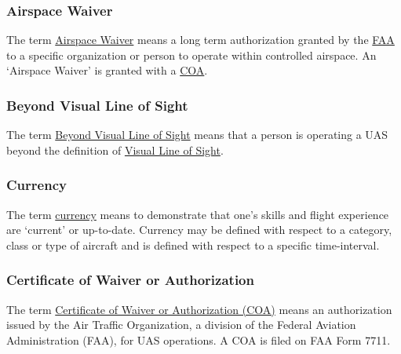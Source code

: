 \documentclass[
]{book}
\begin{document}
\hypertarget{AW}{%
\subsubsection*{Airspace Waiver}\label{AW}}

The term \protect\hyperlink{AW}{Airspace Waiver} means a long term authorization granted by the \protect\hyperlink{FAA}{FAA} to a specific organization or person to operate within controlled airspace. An `Airspace Waiver' is granted with a \protect\hyperlink{COA}{COA}.





\hypertarget{BVLOS}{%
\subsubsection*{Beyond Visual Line of Sight}\label{BVLOS}}

The term \protect\hyperlink{BVLOS}{Beyond Visual Line of Sight} means that a person is operating a UAS beyond the definition of \protect\hyperlink{VLOS}{Visual Line of Sight}.





\hypertarget{currency}{%
\subsubsection*{Currency}\label{currency}}

The term \protect\hyperlink{currency}{currency} means to demonstrate that one's skills and flight experience are `current' or up-to-date. Currency may be defined with respect to a category, class or type of aircraft and is defined with respect to a specific time-interval.



\hypertarget{COA}{%
\subsubsection*{Certificate of Waiver or Authorization}\label{COA}}

The term \protect\hyperlink{COA}{Certificate of Waiver or Authorization (COA)} means an authorization issued by the Air Traffic Organization, a division of the Federal Aviation Administration (FAA), for UAS operations. A COA is filed on FAA Form 7711.
\end{document}
